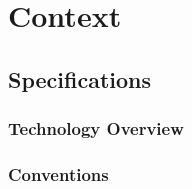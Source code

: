 \chapter{Context} \label{ch:context}

\section{Specifications} \label{sec:specs}

\subsection{Technology Overview}

\subsection{Conventions}
